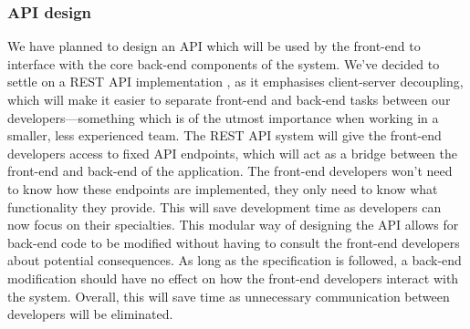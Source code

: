 \documentclass[10pt]{article}
\begin{document}
\subsubsection{API design}
We have planned to design an API which will be used by the front-end to
interface with the core back-end components of the system. We've decided to
settle on a REST API implementation \cite{restAPIs}, as it emphasises
client-server decoupling, which will make it easier to separate front-end and
back-end tasks between our developers—something which is of the utmost
importance when working in a smaller, less experienced team. The REST API system
will give the front-end developers access to fixed API endpoints, which will act
as a bridge between the front-end and back-end of the application. The front-end
developers won't need to know how these endpoints are implemented, they only
need to know what functionality they provide. This will save development time as
developers can now focus on their specialties. This modular way of designing the
API allows for back-end code to be modified without having to consult the
front-end developers about potential consequences. As long as the specification
is followed, a back-end modification should have no effect on how the front-end
developers interact with the system. Overall, this will save time as unnecessary
communication between developers will be eliminated.
\end{document}
